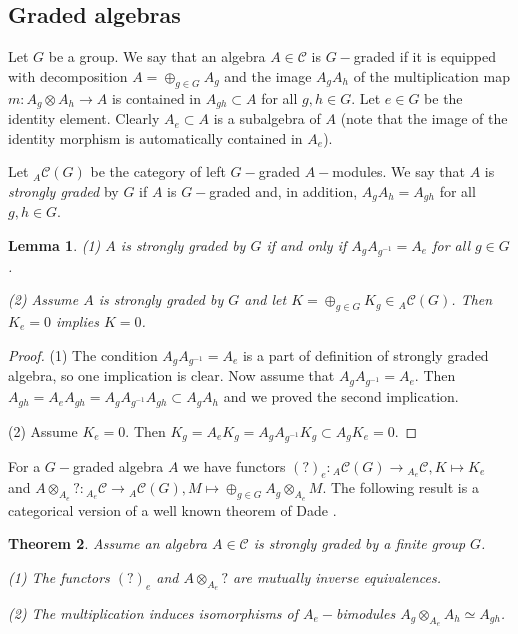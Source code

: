 \documentclass{amsart}
\newtheorem{theorem}{Theorem}[section]
\newtheorem{lemma}[theorem]{Lemma}
\theoremstyle{definition}
\newcommand{\C}{\mathcal{C}}
\numberwithin{equation}{section}
\begin{document}
\subsection{Graded algebras} Let $G$ be a group. We say that an algebra $A\in \C$ is
$G-$graded if it is equipped with decomposition $A=\oplus_{g\in G}A_g$ and the image $A_gA_h$ 
of the multiplication map $m: A_g\otimes A_h\to A$ is contained in $A_{gh}\subset A$ for all
$g,h \in G$. Let $e\in G$ be the identity element. Clearly $A_e\subset A$ is a subalgebra of $A$ (note that the image of the identity morphism
is automatically contained in $A_e$).

Let $\phantom{}_A\C(G)$ be the category of left $G-$graded $A-$modules. 
We say that $A$ is {\em strongly graded} by $G$ if $A$ is $G-$graded and, in addition, $A_gA_h=A_{gh}$
for all $g,h\in G$. 

\begin{lemma}\label{dade1}
 (1) $A$ is strongly graded by $G$ if and only if $A_gA_{g^{-1}}=A_e$
 for all $g\in G$.

 (2) Assume $A$ is strongly graded by $G$ and let $K=\oplus_{g\in G}K_g\in \phantom{}_A\C(G)$. Then $K_e=0$ implies $K=0$.
\end{lemma}

\begin{proof}
  (1) The condition  $A_gA_{g^{-1}}=A_e$ is a part of definition of strongly graded algebra, so one implication is clear. Now assume
  that $A_gA_{g^{-1}}=A_e$. Then $A_{gh}=A_eA_{gh}=A_gA_{g^{-1}}A_{gh}\subset A_gA_h$ and we proved the second implication.

  (2) Assume $K_e=0$. Then $K_g=A_eK_g=A_gA_{g^{-1}}K_g\subset A_gK_e=0$.
\end{proof}

For a $G-$graded algebra $A$ we have functors $(?)_e: \phantom{}_A\C(G)\to \phantom{}_{A_e}\C, K\mapsto K_e$ and $A\otimes_{A_e}?: \phantom{}_{A_e}\C \to \phantom{}_A\C(G), M\mapsto \oplus_{g\in G}A_g\otimes_{A_e}M$. 
The following result is a categorical version of a well known theorem of Dade \cite{D}.

\begin{theorem}\label{dade2}
Assume an algebra $A\in \C$ is strongly graded by a finite group $G$. 

(1) The functors $(?)_e$ and $A\otimes_{A_e}?$ are mutually inverse equivalences.

(2) The multiplication induces isomorphisms of $A_e-$bimodules
$A_g\otimes_{A_e}A_h\simeq A_{gh}$.
\end{theorem}
\end{document}
